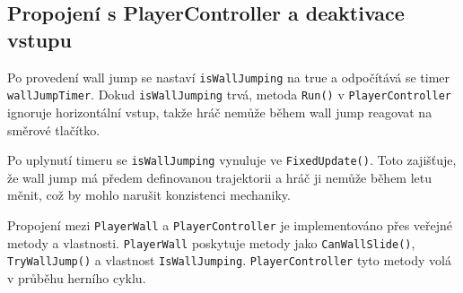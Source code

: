 \subsection{Propojení s PlayerController a deaktivace vstupu}

Po provedení wall jump se nastaví \texttt{isWallJumping} na true a odpočítává se timer \texttt{wallJumpTimer}. Dokud \texttt{isWallJumping} trvá, metoda \texttt{Run()} v \texttt{PlayerController} ignoruje horizontální vstup, takže hráč nemůže během wall jump reagovat na směrové tlačítko.

Po uplynutí timeru se \texttt{isWallJumping} vynuluje ve \texttt{FixedUpdate()}. Toto zajišťuje, že wall jump má předem definovanou trajektorii a hráč ji nemůže během letu měnit, což by mohlo narušit konzistenci mechaniky.

Propojení mezi \texttt{PlayerWall} a \texttt{PlayerController} je implementováno přes veřejné metody a vlastnosti. \texttt{PlayerWall} poskytuje metody jako \texttt{CanWallSlide()}, \texttt{TryWallJump()} a vlastnost \texttt{IsWallJumping}. \texttt{PlayerController} tyto metody volá v průběhu herního cyklu.